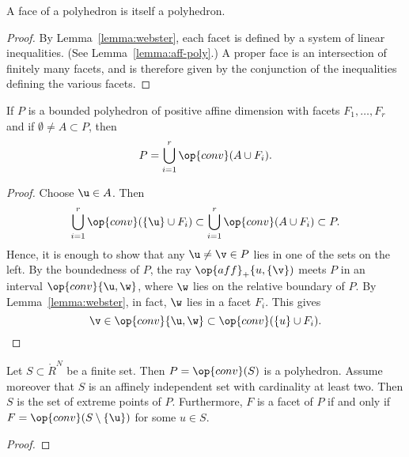 \begin{corollary}
A face of a polyhedron is itself a polyhedron.  
\end{corollary}

\begin{proof} By Lemma~\ref{lemma:webster}, each facet is defined by a
system of linear inequalities.  (See Lemma~\ref{lemma:aff-poly}.)  A
proper face is an intersection of finitely many facets, and is
therefore given by the conjunction of the inequalities defining the
various facets.
\end{proof}

\begin{lemma}[]\label{lemma:facet-partition}
  If $P$ is a bounded polyhedron of positive affine dimension with
  facets $F_1,\ldots,F_r$ and if $\emptyset\ne A\subset P$, then
\begin{displaymath}
P = \bigcup_{i=1}^r \op{conv}(A\cup F_i).
\end{displaymath}
\end{lemma}

\begin{proof}
Choose $\u\in A$.   Then
\begin{displaymath}
\bigcup_{i=1}^r \op{conv}(\{\u\}\cup F_i) \subset \bigcup_{i=1}^r \op{conv}(A\cup F_i)\subset P.
\end{displaymath}
Hence, it is enough to show that any $\u\ne\v\in P$ lies in one of the sets on the left.
By the boundedness of $P$, the ray $\op{aff}_+\{u,\{\v\})$ meets $P$ in an interval
$\op{conv}\{\u,\w\}$, where $\w$ lies on the relative boundary of $P$.  By Lemma~\ref{lemma:webster}, in fact, $\w$ lies in a facet $F_i$.  This gives
\begin{displaymath}
 \v\in \op{conv}\{\u,\w\}\subset \op{conv}(\{u\}\cup F_i).
\end{displaymath}
\end{proof}


\begin{lemma}[]\label{lemma:simplex-poly}
  Let $S\subset\ring{R}^N$ be a finite set.  Then $P=\op{conv}(S)$ is
  a polyhedron.  Assume moreover that $S$ is an affinely independent
  set with cardinality at least two.  Then $S$ is the set of extreme
  points of $P$. Furthermore,   $F$ is a facet of $P$ if and only if $F =
  \op{conv}(S\setminus \{\u\})$ for some $u\in S$.
\end{lemma}

\begin{proof}
\end{proof}

